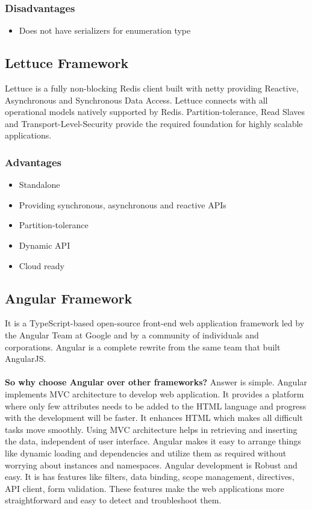 \documentclass[a4paper, hidelinks, 12pt]{report}
\begin{document}
\subsubsection{Disadvantages}
			\begin{itemize}
		\item{} Does not have serializers for enumeration type
		\end{itemize}
		
\subsection{Lettuce Framework} Lettuce is a fully non-blocking Redis client built with netty providing Reactive, Asynchronous and Synchronous Data Access. Lettuce connects with all operational models natively supported by Redis. Partition-tolerance, Read Slaves and Transport-Level-Security provide the required foundation for highly scalable applications.
\subsubsection{Advantages}
\begin{itemize}
\item{} Standalone
\item{} Providing synchronous, asynchronous and reactive APIs
\item{} Partition-tolerance
\item{} Dynamic API
\item{} Cloud ready
\end{itemize}


\subsection{Angular Framework} It is a TypeScript-based open-source front-end web application framework led by the Angular Team at Google and by a community of individuals and corporations. Angular is a complete rewrite from the same team that built AngularJS.\\\\
\textbf{So why choose Angular over other frameworks?} Answer is simple. Angular implements MVC architecture to develop web application. It provides a platform where only few attributes needs to be added to the HTML language and progress with the development will be faster. It enhances HTML which makes all difficult tasks move smoothly. Using MVC architecture helps in retrieving and inserting the data, independent of user interface. Angular makes it easy to arrange things like dynamic loading and dependencies and utilize them as required without worrying about instances and namespaces. Angular development is Robust and easy. It is has features like filters, data binding, scope management, directives, API client, form validation. These features make the web applications more straightforward and easy to detect and troubleshoot them.
\end{document}

